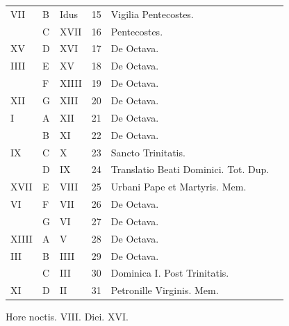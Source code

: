 \begin{center}
\begin{tabular}{l | l | l | r | l l}
\color{Red} VII & B & \color{Red} Idus & 15 & \color{Red} Vigilia Pentecostes. \\
\color{Red}  & C & \color{Red} XVII & 16 & \color{Red} Pentecostes. \\
\color{Red} XV & D & \color{Red} XVI & 17 & De Octava. & \color{Red} \\
\color{Red} IIII & E & \color{Red} XV & 18 & De Octava. \\
\color{Red}  & F & \color{Red} XIIII & 19 & De Octava. \\
\color{Red} XII & G & \color{Red} XIII & 20 & De Octava. & \color{Red} \\
\color{Red} I & \color{Red} A & \color{Red} XII & 21 & De Octava. & \color{Red} \\
\color{Red}  & B & \color{Red} XI & 22 & De Octava. & \color{Red} \\
\color{Red} IX & C & \color{Red} X & 23 & \color{Red} Sancto Trinitatis. \\
\color{Red}  & D & \color{Red} IX & 24 & Translatio Beati Dominici. Tot. Dup. & \color{Red} \\
\color{Red} XVII & E & \color{Red} VIII & 25 & Urbani Pape et Martyris. Mem. & \color{Red} \\
\color{Red} VI & F & \color{Red} VII & 26 & De Octava. & \color{Red} \\
\color{Red}  & G & \color{Red} VI & 27 & De Octava. & \color{Red} \\
\color{Red} XIIII & \color{Red} A & \color{Red} V & 28 & De Octava. & \color{Red} \\
\color{Red} III & B & \color{Red} IIII & 29 & De Octava. & \color{Red} \\
\color{Red}  & C & \color{Red} III & 30 & Dominica I. Post Trinitatis. \color{Red} \\
\color{Red} XI & D & \color{Red} II & 31 & Petronille Virginis. Mem. & \color{Red} \\
\end{tabular}
\newline \color{Red} Hore noctis. VIII. Diei. XVI.
\end{center}



